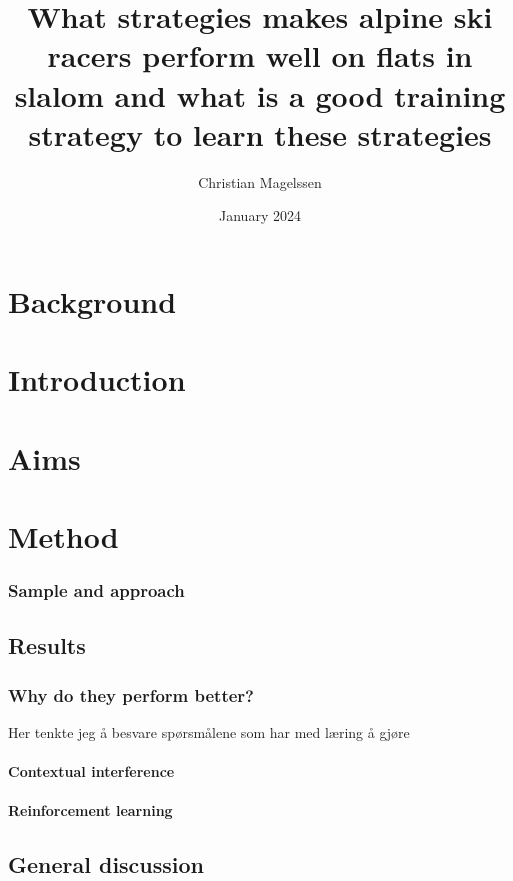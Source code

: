 \documentclass{report}
\title{What strategies makes alpine ski racers perform well on flats in slalom and what is a good training strategy to learn these strategies}
\author{Christian Magelssen}
\date{January 2024}
\begin{document}
\maketitle

\listoffigures

\chapter{Background}


\chapter{Introduction}


\chapter{Aims}





\chapter{Method}



\subsection{Sample and approach}


\section{Results}





\subsection{Why do they perform better?}
Her tenkte jeg å besvare spørsmålene som har med læring å gjøre

\subsubsection{Contextual interference}

\subsubsection{Reinforcement learning}







\section{General discussion}


\printbibliography
\end{document}
